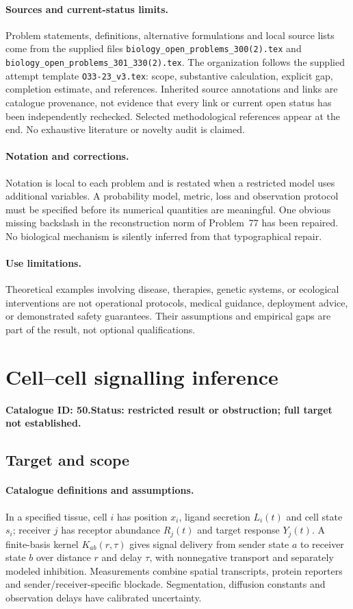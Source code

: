 \documentclass[11pt]{article}
\begin{document}
\paragraph{Sources and current-status limits.}
Problem statements, definitions, alternative formulations and local source lists
come from the supplied files
\texttt{biology\_open\_problems\_300(2).tex} and
\texttt{biology\_open\_problems\_301\_330(2).tex}.
The organization follows the supplied attempt template
\texttt{O33-23\_v3.tex}: scope, substantive calculation, explicit gap,
completion estimate, and references. Inherited source annotations and links are
catalogue provenance, not evidence that every link or current open status has
been independently rechecked. Selected methodological references appear at the
end. No exhaustive literature or novelty audit is claimed.

\paragraph{Notation and corrections.}
Notation is local to each problem and is restated when a restricted model uses
additional variables. A probability model, metric, loss and observation protocol
must be specified before its numerical quantities are meaningful. One obvious
missing backslash in the reconstruction norm of Problem~77 has been repaired.
No biological mechanism is silently inferred from that typographical repair.

\paragraph{Use limitations.}
Theoretical examples involving disease, therapies, genetic systems, or ecological
interventions are not operational protocols, medical guidance, deployment advice,
or demonstrated safety guarantees. Their assumptions and empirical gaps are part
of the result, not optional qualifications.

\setcounter{section}{49}
\section{Cell--cell signalling inference}
\label{prob:050}
\noindent\textbf{Catalogue ID: 50.}\quad \textbf{Status: restricted result or obstruction; full target not established.}
\subsection{Target and scope}
\paragraph{Catalogue definitions and assumptions.}
In a specified tissue, cell $i$ has position $x_i$, ligand secretion $L_i(t)$ and cell state $s_i$; receiver $j$ has receptor abundance $R_j(t)$ and target response $Y_j(t)$. A finite-basis kernel $K_{ab}(r,\tau)$ gives signal delivery from sender state $a$ to receiver state $b$ over distance $r$ and delay $\tau$, with nonnegative transport and separately modeled inhibition. Measurements combine spatial transcripts, protein reporters and sender/receiver-specific blockade. Segmentation, diffusion constants and observation delays have calibrated uncertainty.
\end{document}
